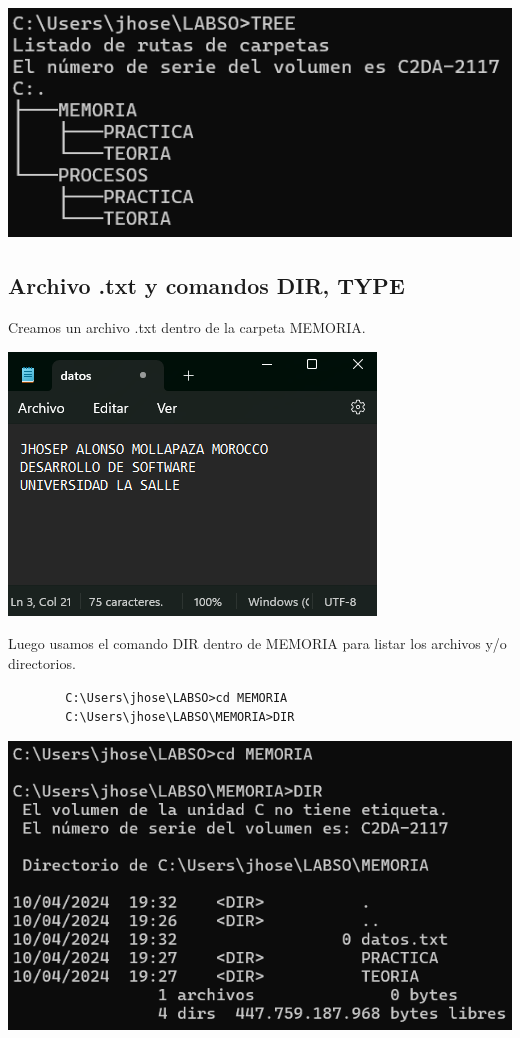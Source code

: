 \documentclass{article}
\begin{document}
    \includegraphics[scale=1]{WindowsCapturas/TREE.png}

    \subsection{Archivo .txt y comandos DIR, TYPE}
        Creamos un archivo .txt dentro de la carpeta MEMORIA.

    \includegraphics[scale=1.2]{WindowsCapturas/datostxt.png}  

        Luego usamos el comando DIR dentro de MEMORIA para listar los archivos y/o directorios.
        \begin{verbatim}
        C:\Users\jhose\LABSO>cd MEMORIA
        C:\Users\jhose\LABSO\MEMORIA>DIR
        \end{verbatim}
        
    \includegraphics[scale=0.8]{WindowsCapturas/DirMemoria.png}  
\end{document}
